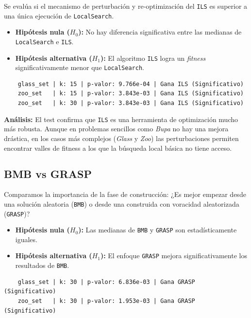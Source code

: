 \documentclass[a4paper,12pt]{article}%
\begin{document}
Se evalúa si el mecanismo de perturbación y re-optimización del \texttt{ILS} es superior a una única ejecución de \texttt{LocalSearch}.
\begin{itemize}
	\item \textbf{Hipótesis nula ($H_0$):} No hay diferencia significativa entre las medianas de \texttt{LocalSearch} e \texttt{ILS}.
	\item \textbf{Hipótesis alternativa ($H_1$):} El algoritmo \texttt{ILS} logra un \textit{fitness} significativamente menor que \texttt{LocalSearch}.
\end{itemize}

{\footnotesize
\begin{verbatim}
	glass_set | k: 15 | p-valor: 9.766e-04 | Gana ILS (Significativo)
	zoo_set   | k: 15 | p-valor: 3.843e-03 | Gana ILS (Significativo)
	zoo_set   | k: 30 | p-valor: 3.843e-03 | Gana ILS (Significativo)
\end{verbatim}
}

\noindent \textbf{Análisis:} El test confirma que \texttt{ILS} es una herramienta de optimización mucho más robusta. Aunque en problemas sencillos como \textit{Bupa} no hay una mejora drástica, en los casos más complejos (\textit{Glass} y \textit{Zoo}) las perturbaciones permiten encontrar valles de fitness a los que la búsqueda local básica no tiene acceso.


\subsection*{BMB vs GRASP}

Comparamos la importancia de la fase de construcción: ¿Es mejor empezar desde una solución aleatoria (\texttt{BMB}) o desde una construida con voracidad aleatorizada (\texttt{GRASP})?
\begin{itemize}
	\item \textbf{Hipótesis nula ($H_0$):} Las medianas de \texttt{BMB} y \texttt{GRASP} son estadísticamente iguales.
	\item \textbf{Hipótesis alternativa ($H_1$):} El enfoque \texttt{GRASP} mejora significativamente los resultados de \texttt{BMB}.
\end{itemize}

{\footnotesize
\begin{verbatim}
	glass_set | k: 30 | p-valor: 6.836e-03 | Gana GRASP (Significativo)
	zoo_set   | k: 30 | p-valor: 1.953e-03 | Gana GRASP (Significativo)
\end{verbatim}
}
\end{document}
